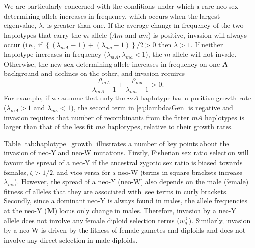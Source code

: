 \documentclass[12pt]{article}
\begin{document}

We are particularly concerned with the conditions under which a rare neo-sex-determining allele increases in frequency, which occurs when the largest eigenvalue, $\lambda$, is greater than one. 
If the average change in frequency of the two haplotypes that carry the $m$ allele ($Am$ and $am$) is positive, invasion will always occur (i.e., if $\left\{(\lambda_{mA}-1)+ (\lambda_{ma}-1) \right\}/2 > 0$ then $\lambda > 1$. 
If neither haplotype increases in frequency ($\lambda_{mA}, \lambda_{ma} < 1$), the $m$ allele will not invade. 
Otherwise, the new sex-determining allele increases in frequency on one \textbf{A} background and declines on the other, and invasion requires
\begin{equation}\label{eq:lambdasGen}
\frac{\rho_{mA}}{\lambda_{mA}-1}+\frac{\rho_{ma}}{\lambda_{ma}-1}>0.
\end{equation}
\noindent For example, if we assume that only the $mA$ haplotype has a positive growth rate ($\lambda_{mA}>1$ and $\lambda_{ma}<1$), the second term in \eqref{eq:lambdasGen} is negative and invasion requires that number of recombinants from the fitter $mA$ haplotypes is larger than that of the less fit $ma$ haplotypes, relative to their growth rates. 

Table \ref{tab:haplotype_growth} illustrates a number of key points about the invasion of neo-Y and neo-W mutations. 
Firstly, Fisherian sex ratio selection will favour the spread of a neo-Y if the ancestral zygotic sex ratio is biased towards females, $\zeta>1/2$, and vice versa for a neo-W (terms in square brackets increase $\lambda_{mi}$).
However, the spread of a neo-Y (neo-W) also depends on the male (female) fitness of alleles that they are associated with, see terms in curly brackets. 
Secondly, since a dominant neo-Y is always found in males, the allele frequencies at the neo-Y (\textbf{M}) locus only change in males. 
Therefore, invasion by a neo-Y allele does not involve any female diploid selection terms ($w_{g}^{\female}$). 
Similarly, invasion by a neo-W is driven by the fitness of female gametes and diploids and does not involve any direct selection in male diploids. 
\end{document}

